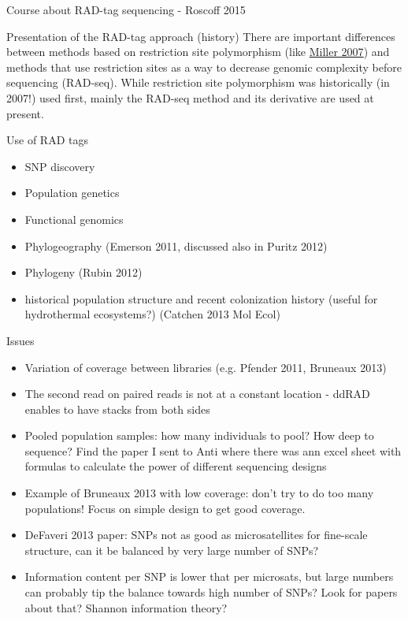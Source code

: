 \documentclass[presentation]{beamer}
\begin{document}
\begin{frame}[label=sec-1]{Course about RAD-tag sequencing - Roscoff 2015}
\begin{block}{Presentation of the RAD-tag approach (history)}
There are important differences between methods based on \alert{restriction site
polymorphism} (like \href{http://genome.cshlp.org/content/17/2/240.long}{Miller 2007}) and methods that use restriction sites as a
way to \alert{decrease genomic complexity} before sequencing (RAD-seq). While
restriction site polymorphism was historically (in 2007!) used first, mainly
the RAD-seq method and its derivative are used at present.
\end{block}
\begin{block}{Use of RAD tags}
\begin{itemize}
\item SNP discovery
\item Population genetics
\item Functional genomics
\item Phylogeography (Emerson 2011, discussed also in Puritz 2012)
\item Phylogeny (Rubin 2012)
\item historical population structure and recent colonization history (useful for
hydrothermal ecosystems?) (Catchen 2013 Mol Ecol)
\end{itemize}
\end{block}

\begin{block}{Issues}
\begin{itemize}
\item Variation of coverage between libraries (e.g. Pfender 2011, Bruneaux 2013)
\item The second read on paired reads is not at a constant location - ddRAD enables
to have stacks from both sides
\item Pooled population samples: how many individuals to pool? How deep to
sequence? Find the paper I sent to Anti where there was ann excel sheet with
formulas to calculate the power of different sequencing designs
\item Example of Bruneaux 2013 with low coverage: don't try to do too many
populations! Focus on simple design to get good coverage.
\item DeFaveri 2013 paper: SNPs not as good as microsatellites for fine-scale
structure, can it be balanced by very large number of SNPs?
\item Information content per SNP is lower that per microsats, but large numbers
can probably tip the balance towards high number of SNPs? Look for papers
about that? Shannon information theory?
\end{itemize}
\end{block}


\end{frame}
\end{document}
